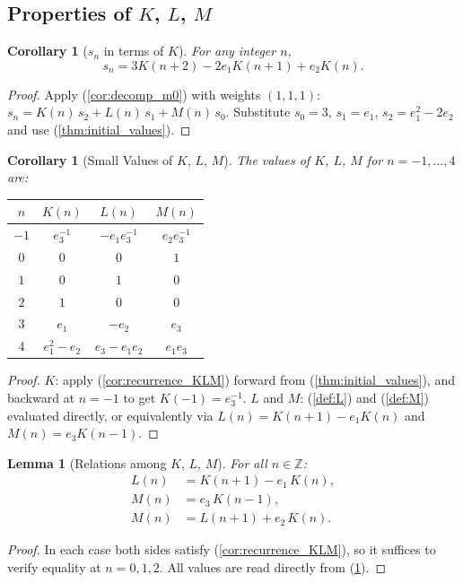 \documentclass[12pt]{article}
\newtheorem{lemma}[theorem]{Lemma}
\newtheorem{corollary}[theorem]{Corollary}
\theoremstyle{definition}
\begin{document}
	\subsection{Properties of $K$, $L$, $M$}
	
	\begin{corollary}[$s_n$ in terms of $K$]
		\label{cor:sn_K}
		For any integer $n$,
		\[ s_n = 3K(n+2) - 2e_1 K(n+1) + e_2 K(n). \]
	\end{corollary}
	\begin{proof}
		Apply (\ref{cor:decomp_m0}) with weights $(1,1,1)$: $s_n = K(n)\,s_2 + L(n)\,s_1 + M(n)\,s_0$. Substitute $s_0 = 3$, $s_1 = e_1$, $s_2 = e_1^2 - 2e_2$ and use (\ref{thm:initial_values}).
	\end{proof}
	
	\begin{corollary}[Small Values of $K$, $L$, $M$]
		\label{cor:small_values}
		The values of $K$, $L$, $M$ for $n = -1, \ldots, 4$ are:
		\begin{center}
			\begin{tabular}{c|ccc}
				$n$ & $K(n)$ & $L(n)$ & $M(n)$ \\
				\hline
				$-1$ & $e_3^{-1}$ & $-e_1 e_3^{-1}$ & $e_2 e_3^{-1}$ \\
				$0$  & $0$ & $0$ & $1$ \\
				$1$  & $0$ & $1$ & $0$ \\
				$2$  & $1$ & $0$ & $0$ \\
				$3$  & $e_1$ & $-e_2$ & $e_3$ \\
				$4$  & $e_1^2 - e_2$ & $e_3 - e_1 e_2$ & $e_1 e_3$ \\
			\end{tabular}
		\end{center}
	\end{corollary}
	\begin{proof}
		$K$: apply (\ref{cor:recurrence_KLM}) forward from (\ref{thm:initial_values}), and backward at $n=-1$ to get $K(-1) = e_3^{-1}$. $L$ and $M$: (\ref{def:L}) and (\ref{def:M}) evaluated directly, or equivalently via $L(n) = K(n+1) - e_1 K(n)$ and $M(n) = e_3 K(n-1)$.
	\end{proof}
	
	\begin{lemma}[Relations among $K$, $L$, $M$]
		\label{lem:KLM_relations}
		For all $n \in \mathbb{Z}$:
		\begin{align}
			L(n) &= K(n+1) - e_1\,K(n), \label{eq:L_by_K} \\
			M(n) &= e_3\,K(n-1), \label{eq:M_by_K} \\
			M(n) &= L(n+1) + e_2\,K(n). \label{eq:M_by_LK}
		\end{align}
	\end{lemma}
	\begin{proof}
		In each case both sides satisfy (\ref{cor:recurrence_KLM}), so it suffices to verify equality at $n = 0, 1, 2$. All values are read directly from (\ref{cor:small_values}).
	\end{proof}
	
\end{document}
